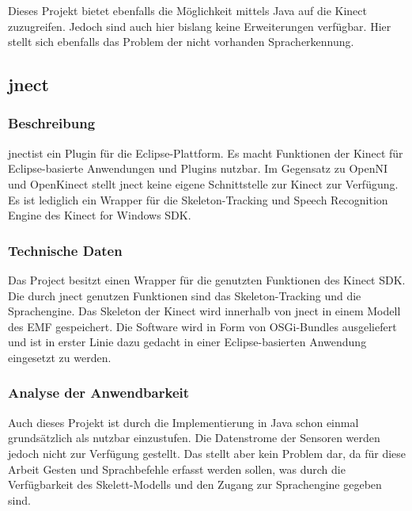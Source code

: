 Dieses Projekt bietet ebenfalls die M\"oglichkeit mittels Java auf die Kinect zuzugreifen. Jedoch sind auch hier bislang keine Erweiterungen verf\"ugbar. Hier stellt sich ebenfalls das Problem der nicht vorhanden Spracherkennung.


\subsection{jnect}
\label{subsec:jnect}

\subsubsection{Beschreibung}

jnect\footnotemark[13] ist ein Plugin f\"ur die Eclipse-Plattform. Es macht Funktionen der Kinect f\"ur Eclipse-basierte Anwendungen und Plugins nutzbar. 
Im Gegensatz zu OpenNI und OpenKinect stellt jnect keine eigene Schnittstelle zur Kinect zur Verf\"ugung. Es ist lediglich ein Wrapper f\"ur die Skeleton-Tracking und Speech Recognition Engine des Kinect for Windows SDK\footnotemark[14]. 


\subsubsection{Technische Daten}

Das Project besitzt einen Wrapper f\"ur die genutzten Funktionen des Kinect SDK. Die durch jnect genutzen Funktionen sind das Skeleton-Tracking 
und die Sprachengine. Das Skeleton der Kinect wird innerhalb von jnect in einem Modell des \gls{EMF} gespeichert. Die Software wird in Form von OSGi-Bundles ausgeliefert 
und ist in erster Linie dazu gedacht in einer Eclipse-basierten Anwendung eingesetzt zu werden.

\subsubsection{Analyse der Anwendbarkeit}

Auch dieses Projekt ist durch die Implementierung in Java schon einmal grunds\"atzlich als nutzbar einzustufen. Die Datenstrome 
der Sensoren werden jedoch nicht zur Verf\"ugung gestellt. Das stellt aber kein Problem dar, da f\"ur diese Arbeit Gesten und Sprachbefehle 
erfasst werden sollen, was durch die Verf\"ugbarkeit des Skelett-Modells und den Zugang zur Sprachengine gegeben sind.

